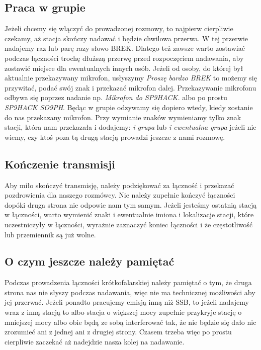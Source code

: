 \documentclass[a4paper,11pt]{article}
\begin{document}
\subsection{Praca w grupie}
Jeżeli chcemy się włączyć do prowadzonej rozmowy, to najpierw cierpliwie czekamy, aż stacja skończy nadawać i będzie chwilowa przerwa. W tej przerwie nadajemy raz lub parę razy słowo BREK. Dlatego też zawsze warto zostawiać podczas łączności trochę dłuższą przerwę przed rozpoczęciem nadawania, aby zostawić miejsce dla ewentualnych innych osób. Jeżeli od osoby, do której był aktualnie przekazywany mikrofon, usłyszymy \textit{Proszę bardzo BREK} to możemy się przywitać, podać swój znak i przekazać mikrofon dalej. Przekazywanie mikrofonu odbywa się poprzez nadanie np. \textit{Mikrofon do SP9HACK.} albo po prostu \textit{SP9HACK SO9PH}. Będąc w grupie odzywamy się dopiero wtedy, kiedy zostanie do nas przekazany mikrofon. Przy wymianie znaków wymieniamy tylko znak stacji, która nam przekazała i dodajemy: \textit{i grupa} lub \textit{i ewentualna grupa} jeżeli nie wiemy, czy ktoś poza tą drugą stacją prowadzi jeszcze z nami rozmowę.
\subsection{Kończenie transmisji}
Aby miło skończyć transmisję, należy podziękować za łączność i przekazać pozdrowienia dla naszego rozmówcy. Nie należy zupełnie kończyć łączności dopóki druga strona nie odpowie nam tym samym. Jeżeli jesteśmy ostatnią stacją w łączności, warto wymienić znaki i ewentualnie imiona i lokalizacje stacji, które uczestniczyły w łączności, wyrażnie zaznaczyć koniec łączności i że częstotliwość lub przemiennik są już wolne.
\subsection{O czym jeszcze należy pamiętać}
Podczas prowadzenia łączności krótkofalarskiej należy pamiętać o tym, że druga strona nas nie słyszy podczas nadawania, więc nie ma technicznej możliwości aby jej przerwać. Jeżeli ponadto pracujemy emisją inną niż SSB, to jeżeli nadajemy wraz z inną stacją to albo stacja o większej mocy zupełnie przykryje stację o mniejszej mocy albo obie będą ze sobą interferować tak, że nie będzie się dało nic zrozumieć ani z jednej ani z drugiej strony. Czasem trzeba więc po prostu cierpliwie zaczekać aż nadejdzie nasza kolej na nadawanie.
\end{document}
